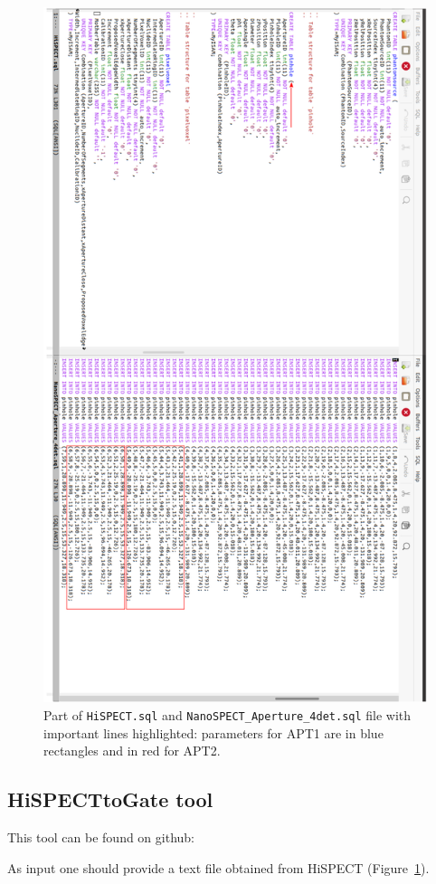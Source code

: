 \documentclass[12pt]{article}
\begin{document}
\begin{figure}[htp]
\centering
\includegraphics[scale=0.45]{figs/HiSPECTpinhole.png}
\caption{Part of \texttt{HiSPECT.sql} and \texttt{NanoSPECT\_Aperture\_4det.sql} file with important lines highlighted: parameters for APT1 are in blue rectangles and in red for APT2.}
\label{fig:HiSPECTpinhole}
\end{figure}

\clearpage
\subsection{HiSPECTtoGate tool}
This tool can be found on github: 

As input one should provide a text file obtained from HiSPECT (Figure~\ref{fig:HiSPECTpinhole}).


%
%
\end{document}
